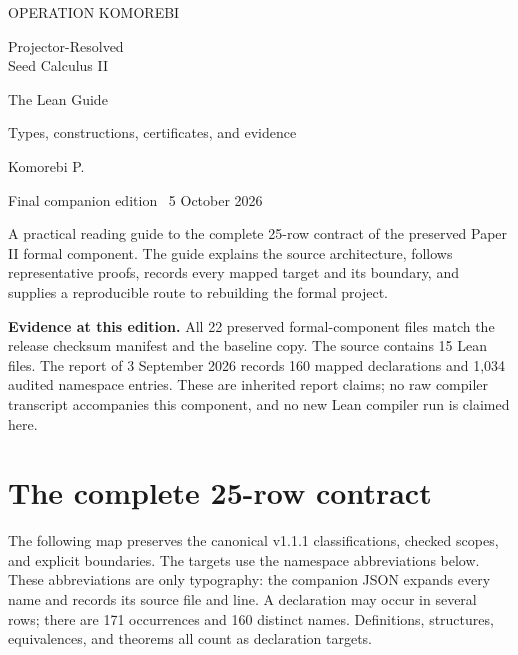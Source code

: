 \documentclass[11pt,a4paper]{article}
\begin{document}
\begin{titlepage}
\vspace*{18mm}
{\sffamily\large\color{teal}OPERATION KOMOREBI}\par
\vspace{14mm}
{\fontsize{32}{37}\selectfont Projector-Resolved\\Seed Calculus II}\par
\vspace{8mm}
{\fontsize{25}{29}\selectfont\sffamily\color{teal}The Lean Guide}\par
\vspace{6mm}
{\Large Types, constructions, certificates, and evidence}\par
\vspace{16mm}
{\large Komorebi P.}\par
{Final companion edition \textperiodcentered\ 5 October 2026}\par
\vfill
\begin{minipage}{.94\textwidth}
A practical reading guide to the complete 25-row contract of the preserved Paper II formal component. The guide explains the source architecture, follows representative proofs, records every mapped target and its boundary, and supplies a reproducible route to rebuilding the formal project.
\medskip

\textbf{Evidence at this edition.} All 22 preserved formal-component files match the release checksum manifest and the baseline copy. The source contains 15 Lean files. The report of 3 September 2026 records 160 mapped declarations and 1,034 audited namespace entries. These are inherited report claims; no raw compiler transcript accompanies this component, and no new Lean compiler run is claimed here.
\end{minipage}
\vspace{10mm}
\end{titlepage}
\tableofcontents
\clearpage






\clearpage
\section{The complete 25-row contract}\label{sec:map}
The following map preserves the canonical v1.1.1 classifications, checked scopes, and explicit boundaries. The targets use the namespace abbreviations below. These abbreviations are only typography: the companion JSON expands every name and records its source file and line. A declaration may occur in several rows; there are 171 occurrences and 160 distinct names. Definitions, structures, equivalences, and theorems all count as declaration targets.


\clearpage
\appendix
\end{document}
